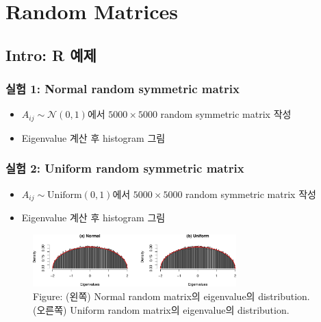 \documentclass[
  13pt,
  letterpaper,
  DIV=11,
  numbers=noendperiod]{scrreprt}
\theoremstyle{definition}
\theoremstyle{plain}
\theoremstyle{definition}
\theoremstyle{plain}
\theoremstyle{plain}
\theoremstyle{definition}
\theoremstyle{remark}
\begin{document}
\chapter{Random Matrices}\label{random-matrices}

\section{Intro: R 예제}\label{intro-r-uxc608uxc81c}

\subsection{실험 1: Normal random symmetric
matrix}\label{uxc2e4uxd5d8-1-normal-random-symmetric-matrix}

\begin{itemize}
\item
  \(A_{ij} \sim \mathcal{N}(0,1)\)에서 \(5000\times 5000\) random
  symmetric matrix 작성
\item
  Eigenvalue 계산 후 histogram 그림
\end{itemize}

\subsection{실험 2: Uniform random symmetric
matrix}\label{uxc2e4uxd5d8-2-uniform-random-symmetric-matrix}

\begin{itemize}
\item
  \(A_{ij} \sim \text{Uniform}(0,1)\)에서 \(5000\times 5000\) random
  symmetric matrix 작성
\item
  Eigenvalue 계산 후 histogram 그림
\end{itemize}

\begin{figure}[th]

{\centering \includegraphics[width=0.7\textwidth,height=\textheight]{rmatrices_files/figure-pdf/unnamed-chunk-2-1.pdf}

}

\caption{Figure: (왼쪽) Normal random matrix의 eigenvalue의
distribution. (오른쪽) Uniform random matrix의 eigenvalue의
distribution.}

\end{figure}%
\end{document}
